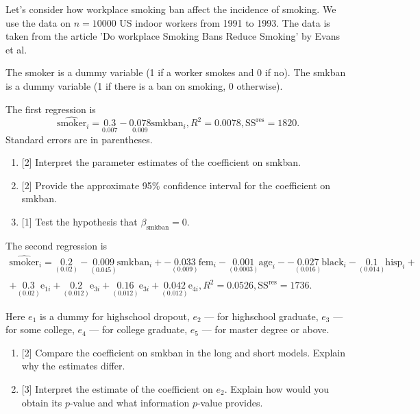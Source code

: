\documentclass[12pt]{article}
\newcommand{\SSR}{\text{SS}^{\text{res}}}
\begin{document}
\begin{enumerate}
    Let's consider how workplace smoking ban affect the incidence of smoking. 
    We use the data on $n=10000$ US indoor workers from 1991 to 1993.
    The data is taken from the article 'Do workplace Smoking Bans Reduce Smoking' by Evans et al. 
    
    The smoker is a dummy variable (1 if a worker smokes and 0 if no).
    The smkban is a dummy variable (1 if there is a ban on smoking, 0 otherwise).
    
    The first regression is 
    \[
    \widehat{\text{smoker}}_i = \underset{0.007}{0.3} - \underset{0.009}{0.078}\text{smkban}_i, R^2 = 0.0078, \SSR = 1820.
    \]
    Standard errors are in parentheses. 
    \begin{enumerate}
        \item {[2]} Interpret the parameter estimates of the coefficient on smkban.
        \item {[2]} Provide the approximate 95\% confidence interval for the coefficient on smkban.
        \item {[1]} Test the hypothesis that $\beta_{\text{smkban}} = 0$.
    \end{enumerate}

    The second regression is 
    \begin{multline*}
        \widehat{\text{smoker}}_i = \underset{(0.02)}{0.2} - \underset{(0.045)}{0.009}\text{smkban}_i + 
        -\underset{(0.009)}{0.033}\text{fem}_i - \underset{(0.0003)}{0.001}\text{age}_i - 
        - \underset{(0.016)}{0.027}\text{black}_i - \underset{(0.014)}{0.1}\text{hisp}_i + \\
        +\underset{(0.02)}{0.3}\text{e}_{1i} + \underset{(0.012)}{0.2}\text{e}_{3i} + 
        \underset{(0.012)}{0.16}\text{e}_{3i} + \underset{(0.012)}{0.042}\text{e}_{4i},
        R^2 = 0.0526, \SSR = 1736.
    \end{multline*}


    Here $e_{1}$ is a dummy for highschool dropout, $e_{2}$ — for highschool graduate, $e_3$ — for some college, 
    $e_4$ — for college graduate, $e_5$ — for master degree or above. 

    \begin{enumerate}[resume]
        \item {[2]} Compare the coefficient on smkban in the long and short models. 
        Explain why the estimates differ. 
        \item {[3]} Interpret the estimate of the coefficient on $e_2$. 
        Explain how would you obtain its $p$-value and what information $p$-value provides. 
    \end{enumerate}


\end{enumerate}
\end{document}
